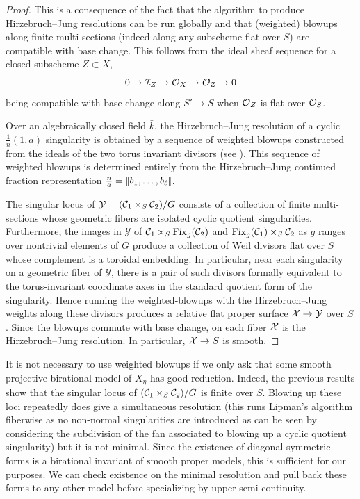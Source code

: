\documentclass[main.tex]{subfiles}
\begin{document}
\begin{proof}
This is a consequence of the fact that the algorithm to produce Hirzebruch--Jung resolutions can be run globally and that (weighted) blowups along finite \etale multi-sections (indeed along any subscheme flat over $S$) are compatible with base change. This follows from the ideal sheaf sequence for a closed subscheme $Z \subset X$,
\[ 0 \to \mathcal{I}_Z \to \mathcal{O}_{X} \to \mathcal{O}_{Z} \to 0 \]
being compatible with base change along $S' \to S$ when $\mathcal{O}_{Z}$ is flat over $\mathcal{O}_S$.
\par 
Over an algebraically closed field $\bar{k}$, the Hirzebruch--Jung resolution of a cyclic $\frac{1}{n}(1, a)$ singularity is obtained by a sequence of weighted blowups constructed from the ideals of the two torus invariant divisors  (see \cite{reid:weighted_blowups}). This sequence of weighted blowups is determined entirely from the Hirzebruch--Jung continued fraction representation $\frac{n}{a} = \llbracket b_1, \dots, b_{\ell} \rrbracket$. 
\par 
The singular locus of $\mathcal{Y} = (\mathcal{C}_1 \times_S \mathcal{C}_2)/G$ consists of a collection of finite \etale multi-sections whose geometric fibers are isolated cyclic quotient singularities. Furthermore, the images in $\mathcal{Y}$ of $\mathcal{C}_1 \times_S \operatorname{\mathrm{Fix}}_g(\mathcal{C}_2)$ and $\operatorname{\mathrm{Fix}}_g(\mathcal{C}_1) \times_S \mathcal{C}_2$ as $g$ ranges over nontrivial elements of $G$ produce a collection of Weil divisors flat over $S$ whose complement is a toroidal embedding. In particular, near each singularity on a geometric fiber of $\mathcal{Y}$, there is a pair of such divisors formally equivalent to the torus-invariant coordinate axes in the standard quotient form of the singularity. Hence running the weighted-blowups with the Hirzebruch--Jung weights along these divisors produces a relative flat proper surface $\mathcal{X} \to \mathcal{Y}$ over $S$. Since the blowups commute with base change, on each fiber $\mathcal{X}$ is the Hirzebruch--Jung resolution. In particular, $\mathcal{X} \to S$ is smooth.
\end{proof}

\begin{rmk}
It is not necessary to use weighted blowups if we only ask that some smooth projective birational model of $X_{\eta}$ has good reduction. Indeed, the previous results show that the singular locus of $(\mathcal{C}_1 \times_S \mathcal{C}_2) / G$ is finite \etale over $S$. Blowing up these loci repeatedly does give a simultaneous resolution (this runs Lipman's algorithm fiberwise as no non-normal singularities are introduced as can be seen by considering the subdivision of the fan associated to blowing up a cyclic quotient singularity) but it is not minimal. Since the existence of diagonal symmetric forms is a birational invariant of smooth proper models, this is sufficient for our purposes. We can check existence on the minimal resolution and pull back these forms to any other model before specializing by upper semi-continuity. 
\end{rmk}
\end{document}
